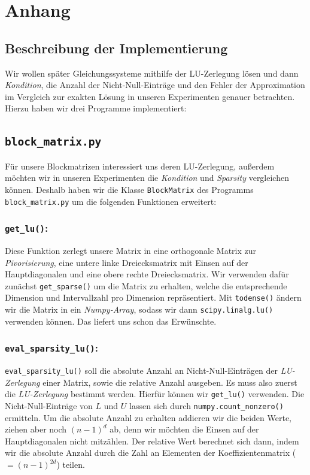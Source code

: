 \documentclass[smallheadings]{scrartcl}
\theoremstyle{definition}
\begin{document}
\newpage
\section{Anhang}
\subsection*{Beschreibung der Implementierung}
Wir wollen später Gleichungssysteme mithilfe der LU-Zerlegung lösen und  dann \textit{Kondition}, die Anzahl der Nicht-Null-Einträge und den Fehler der Approximation im Vergleich zur exakten Lösung in unseren Experimenten genauer betrachten.
Hierzu haben wir drei Programme implementiert:

\subsection{\texttt{block\_matrix.py}}
Für unsere Blockmatrizen interessiert uns deren LU-Zerlegung, außerdem möchten wir in unseren Experimenten die \textit{Kondition} und \textit{Sparsity} vergleichen können.
Deshalb haben wir die Klasse \texttt{BlockMatrix} des Programms
\texttt{block\_matrix.py} um die folgenden Funktionen erweitert:

\subsubsection*{\texttt{get\_lu()}:}
Diese Funktion zerlegt unsere Matrix in eine orthogonale Matrix zur \textit{Pivorisierung}, eine untere linke Dreiecksmatrix mit Einsen auf der Hauptdiagonalen und eine obere rechte Dreiecksmatrix.
Wir verwenden dafür zunächst \texttt{get\_sparse()} um die Matrix zu erhalten, welche die entsprechende Dimension und Intervallzahl pro Dimension repräsentiert. Mit \texttt{todense()} ändern wir die Matrix in ein \textit{Numpy-Array}, sodass wir dann \texttt{scipy.linalg.lu()} verwenden können. Das liefert uns schon das Erwünschte.

\subsubsection*{\texttt{eval\_sparsity\_lu()}:}
\texttt{eval\_sparsity\_lu()} soll die absolute Anzahl an Nicht-Null-Einträgen der \textit{LU-Zerlegung} einer Matrix, sowie die relative Anzahl ausgeben. 
Es muss also zuerst die \textit{LU-Zerlegung} bestimmt werden. Hierfür können wir \texttt{get\_lu()} verwenden. Die Nicht-Null-Einträge von $L$ und $U$ lassen sich durch \texttt{numpy.count\_nonzero()} ermitteln. Um die absolute Anzahl zu erhalten addieren wir die beiden Werte, ziehen aber noch $(n-1)^d$ ab, denn wir möchten die Einsen auf der Hauptdiagonalen nicht mitzählen.
Der relative Wert berechnet sich dann, indem wir die absolute Anzahl durch die Zahl an Elementen der Koeffizientenmatrix ($=(n-1)^{2d}$) teilen.
\end{document}
